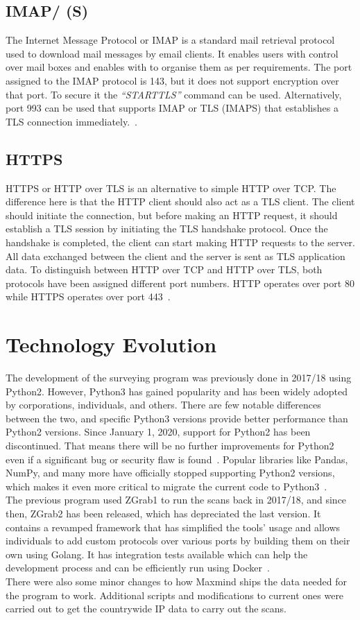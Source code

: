\subsection{IMAP/ (S)}
The Internet Message Protocol or IMAP is a standard mail retrieval protocol used to download mail messages by email clients. It enables 
users with control over mail boxes and enables with to organise them as per requirements. The port assigned to the IMAP protocol is 143, 
but it does not support encryption over that port. To secure it the \textit{``STARTTLS''} command can be used. Alternatively, port 993 can be used 
that supports IMAP or TLS (IMAPS) that establishes a TLS connection immediately.~\cite{rfc9051}.

\subsection{HTTPS}
HTTPS or HTTP over TLS is an alternative to simple HTTP over TCP. The difference here is that the HTTP client should also act as a TLS 
client. The client should initiate the connection, but before making an HTTP request, it should establish a TLS session by initiating the 
TLS handshake protocol. Once the handshake is completed, the client can start making HTTP requests to the server. All data exchanged between 
the client and the server is sent as TLS application data. To distinguish between HTTP over TCP and HTTP over TLS, both protocols have been 
assigned different port numbers. HTTP operates over port 80 while HTTPS operates over port 443~\cite{rfc2818}.

\section{Technology Evolution}
The development of the surveying program was previously done in 2017/18 using Python2. However, Python3 has gained popularity and has been 
widely adopted by corporations, individuals, and others. There are few notable differences between the two, and specific Python3 versions 
provide better performance than Python2 versions. Since January 1, 2020, support for Python2 has been discontinued. That means there
will be no further improvements for Python2 even if a significant bug or security flaw is found~\cite{10.5555/1593511}. Popular libraries 
like Pandas, NumPy, and many more have officially stopped supporting Python2 versions, which makes it even more critical to migrate the current code to 
Python3~\cite{Installa51:online}.\\
The previous program used ZGrab1 to run the scans back in 2017/18, and since then, ZGrab2 has been released, which has depreciated the last version. 
It contains a revamped framework that has simplified the tools' usage and allows individuals to add custom protocols over various ports by building them on their own using Golang. It has 
integration tests available which can help the development process and can be efficiently run using Docker~\cite{merkel2014docker,zgrab2Github}.\\
There were also some minor changes to how Maxmind ships the data needed for the program to work. Additional scripts and modifications to current ones were carried out to get 
the countrywide IP data to carry out the scans.

